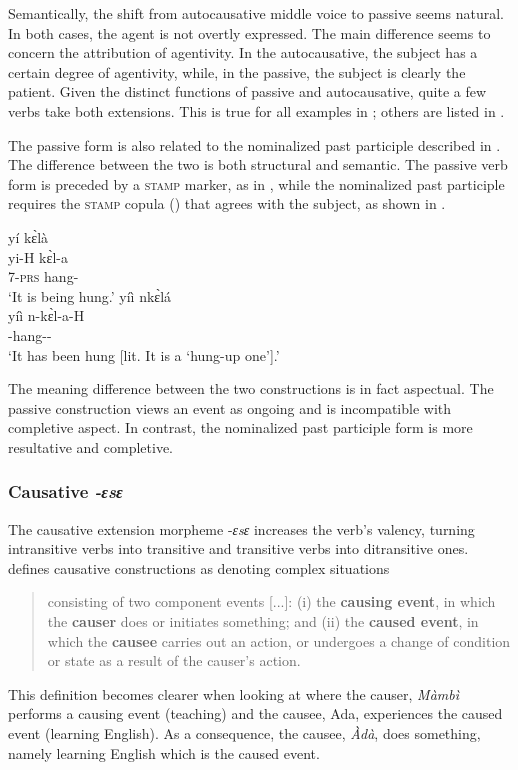 Semantically, the shift from autocausative middle voice to passive seems natural. In both cases, the agent is not overtly expressed. The main difference seems to concern the attribution of agentivity. In the autocausative, the subject has a certain degree of agentivity, while, in the passive, the subject is clearly the patient.  Given the distinct functions of passive and autocausative, quite a few verbs take both extensions. This is true for all examples in ; others are listed in .

The passive form is also related to the nominalized past participle described in . The difference between the two  is both structural and semantic. The passive verb form is preceded by a \textsc{stamp} marker, as in , while the nominalized past participle requires the \textsc{stamp} copula () that agrees with the subject, as shown in .

\ea \label{PASS}
 \glll yí kɛ̀là  \\
	yi-H kɛ̀l-a \\
         7-\textsc{prs} hang-{\PASS}  \\
    \trans `It is being hung.'
\ex \label{NomPart}
 \glll yíì nkɛ̀lá  \\
         yíì n-kɛ̀l-a-H \\
	{\COP} {\NOM}-hang-{\PASS}-{\NOM} \\
    \trans `It has been hung [lit. It is a `hung-up one'].'
\z

\noindent The meaning difference between the two constructions is in fact aspectual. The passive construction views an event as ongoing and is incompatible with completive aspect. In contrast,  the nominalized past participle form is more resultative and completive.


\subsubsection{Causative \textit{-ɛsɛ}}
\label{sec:CAU} 

The causative extension morpheme -{\itshape ɛsɛ} increases the verb's valency, turning intransitive verbs into transitive and transitive verbs into ditransitive ones. \citet{song2013} defines causative constructions as denoting complex situations
\begin{quote}
consisting of two component events [...]: (i) the {\bfseries causing event}, in which the {\bfseries causer} does or initiates something; and (ii) the {\bfseries caused event}, in which the {\bfseries causee} carries out an action, or undergoes a change of condition or state as a result of the causer’s action.
\end{quote}
This definition becomes clearer when looking at  where the causer, {\itshape Màmbì} performs a causing event (teaching) and the causee, Ada, experiences the caused event (learning English). As a consequence, the causee, {\itshape Àdà}, does something, namely learning English which is the caused event.

